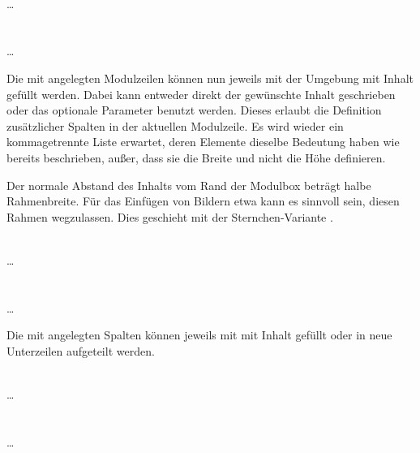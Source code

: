 \documentclass[a4paper,11pt]{tubsreprt}
\begin{document}
\begin{Declaration}
    \\%
  \quad\dots\\
  \\
    \\%
  \quad\dots\\
\end{Declaration}

Die mit  angelegten Modulzeilen können nun jeweils mit
der Umgebung  mit Inhalt gefüllt werden.
Dabei kann entweder direkt der gewünschte Inhalt geschrieben oder das optionale
Parameter  benutzt werden.
Dieses erlaubt die Definition zusätzlicher Spalten in der aktuellen Modulzeile.
Es wird wieder ein kommagetrennte Liste erwartet,
deren Elemente dieselbe Bedeutung haben wie bereits beschrieben, außer, dass
sie die Breite und nicht die Höhe definieren.

Der normale Abstand des Inhalts vom Rand der Modulbox beträgt halbe
Rahmenbreite. Für das Einfügen von Bildern etwa kann es sinnvoll sein,
diesen Rahmen wegzulassen. Dies geschieht mit der Sternchen-Variante
.


\begin{Declaration}
    \\%
  \quad\dots\\
  \\
    \\%
  \quad\dots\\
\end{Declaration}

Die mit  angelegten Spalten können jeweils mit 
 mit Inhalt gefüllt oder in neue Unterzeilen aufgeteilt 
werden.

\begin{Declaration}
  \\%
  \quad\dots\\
  \\
  \\%
  \quad\dots\\
\end{Declaration}
\end{document}
